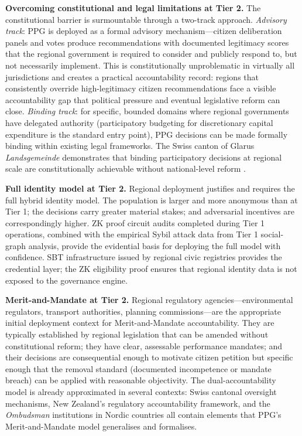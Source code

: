 \documentclass[12pt,a4paper,oneside]{report}
\begin{document}
\textbf{Overcoming constitutional and legal limitations at Tier 2.} The constitutional barrier is surmountable through a two-track approach. \emph{Advisory track}: PPG is deployed as a formal advisory mechanism---citizen deliberation panels and votes produce recommendations with documented legitimacy scores that the regional government is required to consider and publicly respond to, but not necessarily implement. This is constitutionally unproblematic in virtually all jurisdictions and creates a practical accountability record: regions that consistently override high-legitimacy citizen recommendations face a visible accountability gap that political pressure and eventual legislative reform can close. \emph{Binding track}: for specific, bounded domains where regional governments have delegated authority (participatory budgeting for discretionary capital expenditure is the standard entry point), PPG decisions can be made formally binding within existing legal frameworks. The Swiss canton of Glarus \textit{Landsgemeinde} demonstrates that binding participatory decisions at regional scale are constitutionally achievable without national-level reform \citep{linder2010swiss}.

\textbf{Full identity model at Tier 2.} Regional deployment justifies and requires the full hybrid identity model. The population is larger and more anonymous than at Tier 1; the decisions carry greater material stakes; and adversarial incentives are correspondingly higher. ZK proof circuit audits completed during Tier 1 operations, combined with the empirical Sybil attack data from Tier 1 social-graph analysis, provide the evidential basis for deploying the full model with confidence. SBT infrastructure issued by regional civic registries provides the credential layer; the ZK eligibility proof ensures that regional identity data is not exposed to the governance engine.

\textbf{Merit-and-Mandate at Tier 2.} Regional regulatory agencies---environmental regulators, transport authorities, planning commissions---are the appropriate initial deployment context for Merit-and-Mandate accountability. They are typically established by regional legislation that can be amended without constitutional reform; they have clear, assessable performance mandates; and their decisions are consequential enough to motivate citizen petition but specific enough that the removal standard (documented incompetence or mandate breach) can be applied with reasonable objectivity. The dual-accountability model is already approximated in several contexts: Swiss cantonal oversight mechanisms, New Zealand's regulatory accountability framework, and the \textit{Ombudsman} institutions in Nordic countries all contain elements that PPG's Merit-and-Mandate model generalises and formalises.
\end{document}
